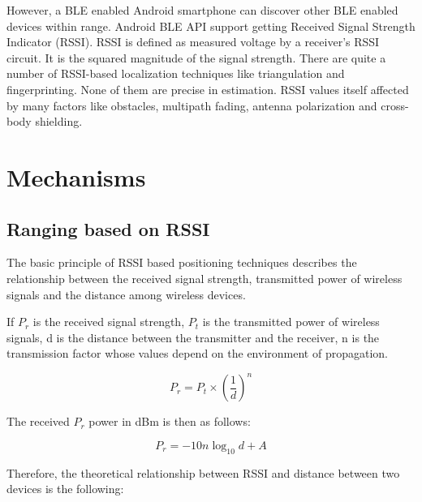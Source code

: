 \documentclass[conference,a4paper]{../../sty/IEEEtran}
\begin{document}
However, a BLE enabled Android smartphone can discover other BLE enabled devices within range. Android BLE API support getting Received Signal Strength Indicator (RSSI). RSSI is defined as measured voltage by a receiver’s RSSI circuit. It is the squared magnitude of the signal strength. There are quite a number of RSSI-based localization techniques like triangulation and fingerprinting. None of them are precise in estimation. RSSI values itself affected by many factors like obstacles, multipath fading, antenna polarization and cross-body shielding.
 
\section{Mechanisms}

\subsection{Ranging based on RSSI}


The basic principle of RSSI based positioning techniques describes the relationship between the received signal strength, transmitted power of wireless signals and the distance among wireless devices.

If $P_{r}$ is the received signal strength, $P_{t}$ is the transmitted power of wireless 
signals, d is the distance between the transmitter and the receiver, n is the transmission factor whose values depend on the environment of propagation. \cite{xu2010distance}

\begin{equation}
  P_{r} = P_{t} \times (\frac{1}{d})^{n}
 \label{eq1}
\end{equation}

The received $P_{r}$ power in dBm is then as follows:

\begin{equation}
  P_{r} =-10n \log_{10}d + A
 \label{eq2}
\end{equation}

Therefore, the theoretical relationship between RSSI and distance between two devices is the following: \cite{chung2007enhanced}
\end{document}
